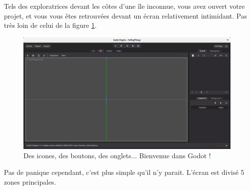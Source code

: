 Tels des exploratrices devant les côtes d'une île inconnue, vous avez ouvert votre projet, et vous vous êtes retrouvées devant un écran relativement intimidant. Pas très loin de celui de la figure \ref{lvl1-screen4}.

\begin{figure}
  \begin{center}
    \includegraphics[width=12cm]{img/lvl1-screen4.png}
  \end{center}
  \caption{\label{lvl1-screen4} Des icones, des boutons, des onglets... Bienvenue dans Godot !}
\end{figure}

Pas de panique cependant, c'est plus simple qu'il n'y parait. L'écran est divisé 5 zones principales.


